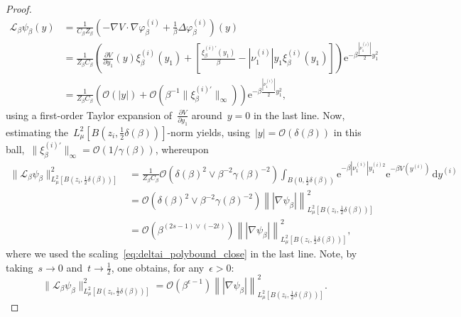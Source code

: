 \documentclass[10pt]{article}
\newcommand{\cL}{\mathcal{L}}
\renewcommand{\d}{\mathrm{d}}
\newcommand{\e}{\mathrm{e}}
\newcommand{\1}{\mathbbm 1}
\newcommand{\largeRadius}{\delta}
\newcommand{\smallRadius}{\gamma}
\newcommand{\hessEigval}[2]{\nu^{(#1)}_{#2}} %
\newcommand{\fineCutoff}[1]{\xi_\beta^{(#1)}}
\newcommand{\deltaScalingExp}{s}
\newcommand{\gammaScalingExp}{t}
\renewcommand{\O}{\mathcal{O}}
\begin{document}
\begin{proof}
            \begin{align*}
                \cL_\beta\psi_\beta(y) &= \frac1{C_\beta Z_\beta}\left(-\nabla V \cdot \nabla \varphi_\beta^{(i)} + \frac1\beta\Delta\varphi_\beta^{(i)}\right)(y)\\
                &= \frac1{Z_\beta C_\beta}\left(\frac{\partial V}{\partial y_1}(y)\fineCutoff{i}(y_1) + \left[\frac{\xi_\beta^{(i)\prime}(y_1)}{\beta}- |\hessEigval{i}{1}|y_1\fineCutoff{i}(y_1)\right]\right)\e^{-\beta\frac{|\hessEigval{i}{1}|}{2}y_1^2}\\
                &= \frac1{Z_\beta C_\beta}\left(\O(|y|) + \O\left(\beta^{-1}\|\xi_\beta^{(i)\prime}\|_\infty\right)\right)\e^{-\beta\frac{|\hessEigval{i}{1}|}{2}y_1^2},
            \end{align*}
            using a first-order Taylor expansion of~$\frac{\partial V}{\partial y_1}$ around~$y=0$ in the last line. Now, estimating the~$L^2_\mu\left[B\left(z_i,\frac12\largeRadius(\beta)\right)\right]$-norm yields, using~$|y| = \O\left(\largeRadius(\beta)\right)$ in this ball,~$\|\xi_\beta^{(i)\prime}\|_\infty = \O(1/\smallRadius(\beta))$, whereupon
            \begin{align*}
                \|\cL_\beta \psi_\beta\|^2_{L^2_\mu\left[B\left(z_i,\frac12\largeRadius(\beta)\right)\right]} &= \frac1{Z_\beta C_\beta}\O\left(\largeRadius(\beta)^2 \lor \beta^{-2}\smallRadius(\beta)^{-2}\right) \int_{B\left(0,\frac12\largeRadius(\beta)\right)}\e^{-\beta|\hessEigval{i}{1}|y_1^{(i)2}}\e^{-\beta V(y^{(i)})}\,\d y^{(i)}\\
                &= \O\left(\largeRadius(\beta)^2 \lor \beta^{-2}\smallRadius(\beta)^{-2}\right) \left\||\nabla \psi_\beta|\right\|^2_{{L^2_\mu\left[B\left(z_i,\frac12\largeRadius(\beta)\right)\right]}}\\
                &= \O\left(\beta^{(2\deltaScalingExp-1)\lor(-2\gammaScalingExp)}\right)\left\||\nabla \psi_\beta|\right\|^2_{L^2_\mu\left[B\left(z_i,\frac12\largeRadius(\beta)\right)\right]},
            \end{align*} 
            where we used the scaling~\eqref{eq:deltai_polybound_close} in the last line. Note, by taking~$\deltaScalingExp \to 0$ and~$\gammaScalingExp\to \frac12$, one obtains, for any~$\epsilon>0$:
            \[\|\cL_\beta \psi_\beta\|^2_{L^2_\mu\left[B\left(z_i,\frac12\largeRadius(\beta)\right)\right]} = \O\left(\beta^{\epsilon-1}\right)\left\||\nabla \psi_\beta|\right\|^2_{L^2_\mu\left[B\left(z_i,\frac12\largeRadius(\beta)\right)\right]}.\]



\end{proof}
\end{document}
